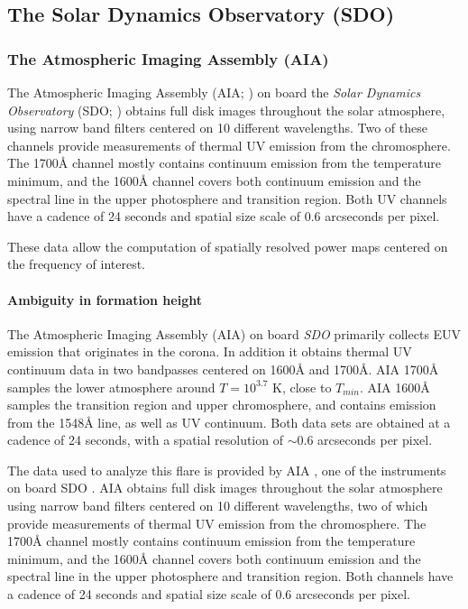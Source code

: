 \subsection{The Solar Dynamics Observatory (SDO)}

\subsubsection{The Atmospheric Imaging Assembly (AIA)}

The Atmospheric Imaging Assembly (AIA; \cite{Lemen2012}) on board the
\textit{Solar Dynamics Observatory} (SDO; \cite{Pesnell2012})
obtains full disk images throughout the solar atmosphere,
using narrow band filters centered on 10 different wavelengths.
Two of these channels provide measurements of
thermal UV emission from the chromosphere.
The 1700\AA{} channel mostly contains continuum emission from the
temperature minimum, and
the 1600\AA{} channel covers
both continuum emission and the  spectral line in the upper
photosphere and transition region.
Both UV channels have a cadence of
24 seconds and spatial size scale of 0.6 arcseconds per pixel.

These data allow the computation of spatially resolved power maps centered
on the frequency of interest.

\paragraph{Ambiguity in formation height}


The Atmospheric Imaging Assembly (AIA) \citep{Lemen2012, Boerner2012}
on board \textit{SDO} primarily collects EUV emission
that originates in the corona.
In addition it obtains thermal UV continuum data in
two bandpasses centered on 1600\AA{} and 1700\AA{}. AIA 1700\AA{} samples the
lower atmosphere around $T = 10^{3.7}$ K, close to $T_{min}$. AIA 1600\AA{}
samples the transition region and upper chromosphere, and contains emission
from the  1548\AA{} line, as well as UV continuum. Both data sets
are obtained at a cadence of 24 seconds, with a spatial resolution of $\sim$0.6
arcseconds per pixel.

The data used to analyze this flare is provided by
AIA \citep{Lemen2012},
one of the instruments on board
SDO \citep{Pesnell2012}.
AIA obtains full disk images throughout the solar atmosphere using narrow band
filters centered on 10 different wavelengths, two of which provide measurements
of thermal UV emission from the chromosphere.
The 1700\AA{} channel mostly contains
continuum emission from the temperature minimum, and the
1600\AA{} channel covers both continuum emission and the
 spectral line in the upper photosphere and transition region.
Both channels have a cadence of 24 seconds and
spatial size scale of 0.6 arcseconds per pixel.



